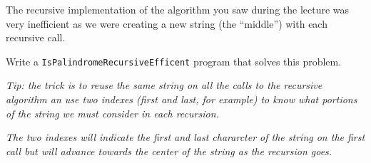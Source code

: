 \documentclass[a4paper, 11pt]{article}
\begin{document}
The recursive implementation of the algorithm you saw during the lecture was
very inefficient as we were creating a new string (the ``middle'') with each
recursive call.

Write a \texttt{IsPalindromeRecursiveEfficent} program that solves this
problem.

\textsl{Tip: the trick is to reuse the same string on all the calls to the
  recursive algorithm an use two indexes (first and last, for example) to know
what portions of the string we must consider in each recursion.}

\textsl{The two indexes will indicate the first and last chararcter of the
string on the first call but will advance towards the center of the string as
the recursion goes.}

\end{document}

